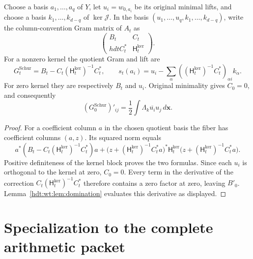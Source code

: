 \begin{hdtproposition}
\label{hdt:wt:prop:Schur}
Choose a basis $a_1,\ldots,a_q$ of $Y$, let $u_i=w_{0,a_i}$
be its original minimal lifts, and choose a basis
$k_1,\ldots,k_{d-q}$ of $\ker\mathcal J$.  In the basis
$(u_1,\ldots,u_q,k_1,\ldots,k_{d-q})$, write the column-convention
Gram matrix of $A_t$ as
\[
 \begin{pmatrix}B_t&C_t\\hdtC_t^*&\mathsf H_t^{\mathrm{ker}}\end{pmatrix}.
\]
For a nonzero kernel the quotient Gram and lift are
\begin{equation}\label{hdt:wt:eq:Schur}
 G_t^{\mathrm{Schur}}=B_t-C_t(\mathsf H_t^{\mathrm{ker}})^{-1}C_t^*,
 \qquad
 s_t(a_i)=u_i-\sum_\alpha
   ((\mathsf H_t^{\mathrm{ker}})^{-1}C_t^*)_{\alpha i}k_\alpha.
\end{equation}
For zero kernel they are respectively $B_t$ and $u_i$.
Original minimality gives $C_0=0$, and consequently
\[
 (G_0^{\mathrm{Schur}})'_{ij}
 =\frac12\int\Lambda_k\overline{u_i}u_j\,d\mathbf x.
\]
\end{hdtproposition}

\begin{proof}
For a coefficient column $a$ in the chosen quotient basis the
fiber has coefficient columns $(a,z)$.  Its squared norm equals
\[
 a^*(B_t-C_t(\mathsf H_t^{\mathrm{ker}})^{-1}C_t^*)a
 +\bigl(z+(\mathsf H_t^{\mathrm{ker}})^{-1}C_t^*a\bigr)^*
 \mathsf H_t^{\mathrm{ker}}
 \bigl(z+(\mathsf H_t^{\mathrm{ker}})^{-1}C_t^*a\bigr).
\]
Positive definiteness of the kernel block proves the two
formulas.  Since each $u_i$ is orthogonal to the kernel at zero,
$C_0=0$.  Every term in the derivative of the correction
$C_t(\mathsf H_t^{\mathrm{ker}})^{-1}C_t^*$ therefore contains a zero
factor at zero, leaving $B'_0$.  Lemma~\ref{hdt:wt:lem:domination}
evaluates this derivative as displayed.
\end{proof}

\section{Specialization to the complete arithmetic packet}
\label{hdt:wt:sec:packet}

